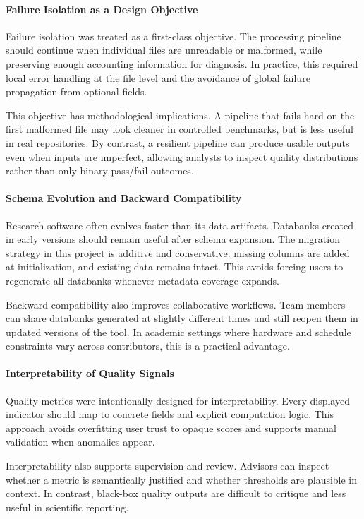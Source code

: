\paragraph{Failure Isolation as a Design Objective}
Failure isolation was treated as a first-class objective. The processing pipeline should continue when individual files are unreadable or malformed, while preserving enough accounting information for diagnosis. In practice, this required local error handling at the file level and the avoidance of global failure propagation from optional fields.

This objective has methodological implications. A pipeline that fails hard on the first malformed file may look cleaner in controlled benchmarks, but is less useful in real repositories. By contrast, a resilient pipeline can produce usable outputs even when inputs are imperfect, allowing analysts to inspect quality distributions rather than only binary pass/fail outcomes.

\paragraph{Schema Evolution and Backward Compatibility}
Research software often evolves faster than its data artifacts. Databanks created in early versions should remain useful after schema expansion. The migration strategy in this project is additive and conservative: missing columns are added at initialization, and existing data remains intact. This avoids forcing users to regenerate all databanks whenever metadata coverage expands.

Backward compatibility also improves collaborative workflows. Team members can share databanks generated at slightly different times and still reopen them in updated versions of the tool. In academic settings where hardware and schedule constraints vary across contributors, this is a practical advantage.

\paragraph{Interpretability of Quality Signals}
Quality metrics were intentionally designed for interpretability. Every displayed indicator should map to concrete fields and explicit computation logic. This approach avoids overfitting user trust to opaque scores and supports manual validation when anomalies appear.

Interpretability also supports supervision and review. Advisors can inspect whether a metric is semantically justified and whether thresholds are plausible in context. In contrast, black-box quality outputs are difficult to critique and less useful in scientific reporting.

